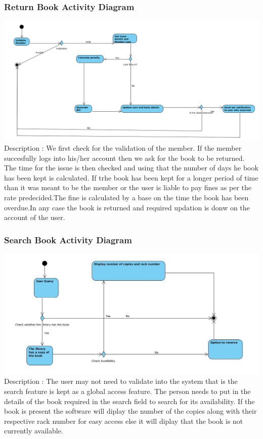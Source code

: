 \documentclass{article}
\begin{document}
\subsubsection*{Return Book Activity Diagram}
\includegraphics[scale=0.40]{images/activityDiagReturn.png}
\\
Description : We first check for the validation of the member. If the member succesfully logs into his/her account then we ask for the book to be returned. The time for the issue is then checked and using that the number of days he book has been kept is calculated. If trhe book has been kept for a longer period of time than it was meant to be the member or the user is liable to pay fines as per the rate predecided.The fine is calculated by a base on the time the book has been overdue.In any case the book is returned and required updation is donw on the account of the user.
\subsubsection*{Search Book Activity Diagram}
\includegraphics[scale=0.50]{images/activityDiagSearch.jpg}
\\
Description : The user may not need to validate into the system that is the search feature is kept as a global access feature. The person needs to put in the details of the book required in the search field to search for its availability. If the book is present the software will diplay the number of the copies along with their respective rack number for easy access else it will diplay that the book is not currently available.
\end{document}
